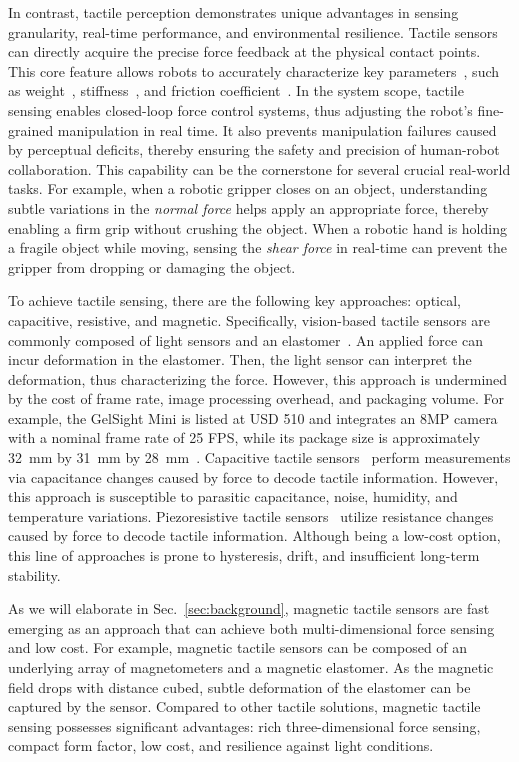 In contrast, tactile perception demonstrates unique advantages in sensing granularity, real-time performance, and environmental resilience.
Tactile sensors can directly acquire the precise force feedback at the physical contact points. 
This core feature allows robots to accurately characterize key parameters~\cite{li2020tactile}, such as weight~\cite{silva2019mass}, stiffness~\cite{yuan2017hardness}, and friction coefficient~\cite{khamis2021friction}.
In the system scope, tactile sensing enables closed-loop force control systems, thus adjusting the robot's fine-grained manipulation in real time. 
It also prevents manipulation failures caused by perceptual deficits, thereby ensuring the safety and precision of human-robot collaboration.
This capability can be the cornerstone for several crucial real-world tasks.
For example, when a robotic gripper closes on an object, understanding subtle variations in the \emph{normal force} helps apply an appropriate force, thereby enabling a firm grip without crushing the object.
When a robotic hand is holding a fragile object while moving, sensing the \emph{shear force} in real-time can prevent the gripper from dropping or damaging the object.

To achieve tactile sensing, there are the following key approaches: optical, capacitive, resistive, and magnetic.
Specifically, vision-based tactile sensors are commonly composed of light sensors and an elastomer~\cite{gelsight2026official}. 
An applied force can incur deformation in the elastomer. 
Then, the light sensor can interpret the deformation, thus characterizing the force.
However, this approach is undermined by the cost of frame rate, image processing overhead, and packaging volume. 
For example, the GelSight Mini is listed at USD 510 and integrates an 8MP camera with a nominal frame rate of 25 FPS, while its package size is approximately 32~mm by 31~mm by 28~mm~\cite{gelsightMiniProduct,gelsightMiniDatasheet}.
Capacitive tactile sensors~\cite{singletact2026official} perform measurements via capacitance changes caused by force to decode tactile information.
However, this approach is susceptible to parasitic capacitance, noise, humidity, and temperature variations. 
Piezoresistive tactile sensors~\cite{tekscan2026official} utilize resistance changes caused by force to decode tactile information.
Although being a low-cost option, this line of approaches is prone to hysteresis, drift, and insufficient long-term stability. 

As we will elaborate in Sec.~\ref {sec:background}, magnetic tactile sensors are fast emerging as an approach that can achieve both multi-dimensional force sensing and low cost.
For example, magnetic tactile sensors can be composed of an underlying array of magnetometers and a magnetic elastomer.
As the magnetic field drops with distance cubed, subtle deformation of the elastomer can be captured by the sensor.
Compared to other tactile solutions, magnetic tactile sensing possesses significant advantages: rich three-dimensional force sensing, compact form factor, low cost, and resilience against light conditions. 

